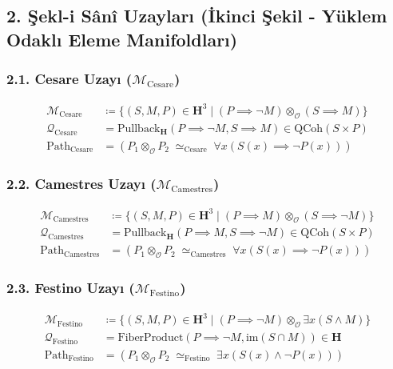 \documentclass[11pt, a4paper]{article}
\begin{document}
\subsection{2. Şekl-i Sânî Uzayları (İkinci Şekil - Yüklem Odaklı Eleme Manifoldları)}

\subsubsection{2.1. Cesare Uzayı ($\mathcal{M}_{\text{Cesare}}$)}
\begin{align}
\mathcal{M}_{\text{Cesare}} &\coloneqq \{ (S, M, P) \in \mathbf{H}^3 \mid (P \implies \neg M) \otimes_{\mathcal{O}} (S \implies M) \} \\
\mathcal{Q}_{\text{Cesare}} &= \text{Pullback}_{\mathbf{H}}(P \implies \neg M, S \implies M) \in \text{QCoh}(S \times P) \\
\text{Path}_{\text{Cesare}} &= (P_1 \otimes_{\mathcal{O}} P_2 \;\simeq_{\text{Cesare}}\; \forall x (S(x) \implies \neg P(x)))
\end{align}

\subsubsection{2.2. Camestres Uzayı ($\mathcal{M}_{\text{Camestres}}$)}
\begin{align}
\mathcal{M}_{\text{Camestres}} &\coloneqq \{ (S, M, P) \in \mathbf{H}^3 \mid (P \implies M) \otimes_{\mathcal{O}} (S \implies \neg M) \} \\
\mathcal{Q}_{\text{Camestres}} &= \text{Pullback}_{\mathbf{H}}(P \implies M, S \implies \neg M) \in \text{QCoh}(S \times P) \\
\text{Path}_{\text{Camestres}} &= (P_1 \otimes_{\mathcal{O}} P_2 \;\simeq_{\text{Camestres}}\; \forall x (S(x) \implies \neg P(x)))
\end{align}

\subsubsection{2.3. Festino Uzayı ($\mathcal{M}_{\text{Festino}}$)}
\begin{align}
\mathcal{M}_{\text{Festino}} &\coloneqq \{ (S, M, P) \in \mathbf{H}^3 \mid (P \implies \neg M) \otimes_{\mathcal{O}} \exists x (S \land M) \} \\
\mathcal{Q}_{\text{Festino}} &= \text{FiberProduct}(P \implies \neg M, \text{im}(S \cap M)) \in \mathbf{H} \\
\text{Path}_{\text{Festino}} &= (P_1 \otimes_{\mathcal{O}} P_2 \;\simeq_{\text{Festino}}\; \exists x (S(x) \land \neg P(x)))
\end{align}
\end{document}
